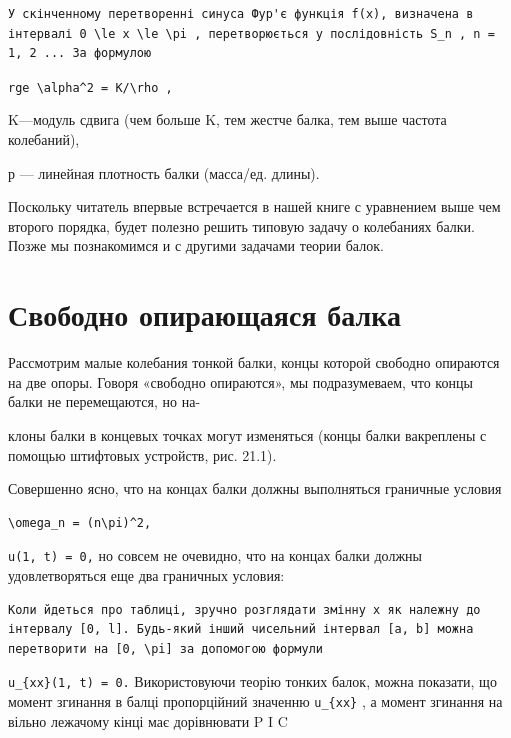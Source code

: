\documentclass[
  ukrainian,
]{article}
\begin{document}
\begin{verbatim}
У скінченному перетворенні синуса Фур'є функція f(x), визначена в інтервалі 0 \le x \le \pi , перетворюється у послідовність S_n , n = 1, 2 ... За формулою
\end{verbatim}

\texttt{rge\ \textquotesingle{}\textbackslash{}alpha\^{}2\ =\ K/\textbackslash{}rho\textquotesingle{}\ ,}

K---модуль сдвига (чем больше K, тем жестче балка, тем выше частота
колебаний),

р --- линейная плотность балки (масса/ед. длины).

Поскольку читатель впервые встречается в нашей книге с уравнением выше
чем второго порядка, будет полезно решить типовую задачу о колебаниях
балки. Позже мы познакомимся и с другими задачами теории балок.

\section{Свободно опирающаяся
балка}\label{ux441ux432ux43eux431ux43eux434ux43dux43e-ux43eux43fux438ux440ux430ux44eux449ux430ux44fux441ux44f-ux431ux430ux43bux43aux430}

Рассмотрим малые колебания тонкой балки, концы которой свободно
опираются на две опоры. Говоря «свободно опираются», мы подразумеваем,
что концы балки не перемещаются, но на-

клоны балки в концевых точках могут изменяться (концы балки вакреплены с
помощью штифтовых устройств, рис. 21.1).

Совершенно ясно, что на концах балки должны выполняться граничные
условия

\begin{verbatim}
\omega_n = (n\pi)^2,
\end{verbatim}

\texttt{u(1,\ t)\ =\ 0,} но совсем не очевидно, что на концах балки
должны удовлетворяться еще два граничных условия:

\begin{verbatim}
Коли йдеться про таблиці, зручно розглядати змінну x як належну до інтервалу [0, l]. Будь-який інший чисельний інтервал [a, b] можна перетворити на [0, \pi] за допомогою формули
\end{verbatim}

\texttt{u\_\{xx\}(1,\ t)\ =\ 0.} Використовуючи теорію тонких балок,
можна показати, що момент згинання в балці пропорційний значенню
\texttt{u\_\{xx\}} , а момент згинання на вільно лежачому кінці має
дорівнювати P I C
\end{document}
